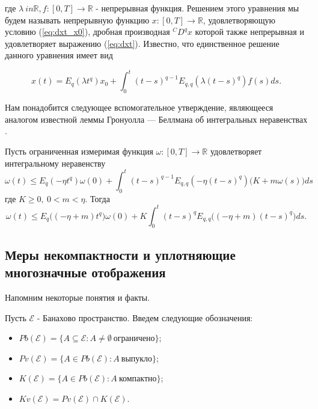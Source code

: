 \noindent где $\lambda \ in \mathbb{R}, f : [0, T] \rightarrow \mathbb{R}$ - непрерывная функция. Решением этого уравнения мы
будем называть непрерывную функцию $x : [0, T] \rightarrow \mathbb{R}$, удовлетворяющую условию (\ref{eq:dxt_x0}),
дробная производная ${}^{C}D^{q}x$ которой также непрерывная и удовлетворяет выражению (\ref{eq:dxt}). Известно, что единственное
решение данного уравнения имеет вид

\begin{equation}
    x(t) = E_{q}(\lambda t^{q})x_{0} + \int_{0}^{t} (t-s)^{q-1} E_{q,q}(\lambda(t-s)^{q})f(s)ds.
\end{equation}

Нам понадобится следующее вспомогательное утверждение, являющееся аналогом известной
леммы Гронуолла — Беллмана об интегральных неравенствах \cite{kamenskii_aa}.

\begin{lemma}
    Пусть ограниченная измеримая функция $\omega: [0, T] \rightarrow \mathbb{R}$ удовлетворяет интегральному неравенству
    \begin{equation}
        \omega(t) \leq E_{q} (-\eta t^{q}) \omega(0) + \int_{0}^{t}(t-s)^{q-1} E_{q,q}(-\eta(t-s)^{q})\Big(K + m\omega(s)\Big)ds
    \end{equation}
    где $K \geq 0, \ 0 < m < \eta$. Тогда
    \begin{equation*}
        \omega(t) \leq E_{q} \Big((-\eta+m)t^{q}\Big) \omega(0) + K \int_{0}^{t} (t-s)^{q} E_{q,q} \Big((-\eta+m)(t-s)^{q}\Big)ds.
    \end{equation*}
\end{lemma}

\subsection{Меры некомпактности и уплотняющие многозначные отображения}

Напомним некоторые понятия и факты.

Пусть $\mathcal{E}$ - Банахово пространство. Введем следующие обозначения:

\begin{itemize}
    \item $Pb(\mathcal{E}) = \{A \subseteq \mathcal{E} : A \neq \emptyset \ \text{ограничено}\}$;
    \item $Pv(\mathcal{E}) = \{A \in Pb(\mathcal{E}) : A \ \text{выпукло}\}$;
    \item $K(\mathcal{E}) = \{A \in Pb(\mathcal{E}) : A \ \text{компактно}\}$;
    \item $Kv(\mathcal{E}) = Pv(\mathcal{E}) \cap K(\mathcal{E})$.
\end{itemize}

